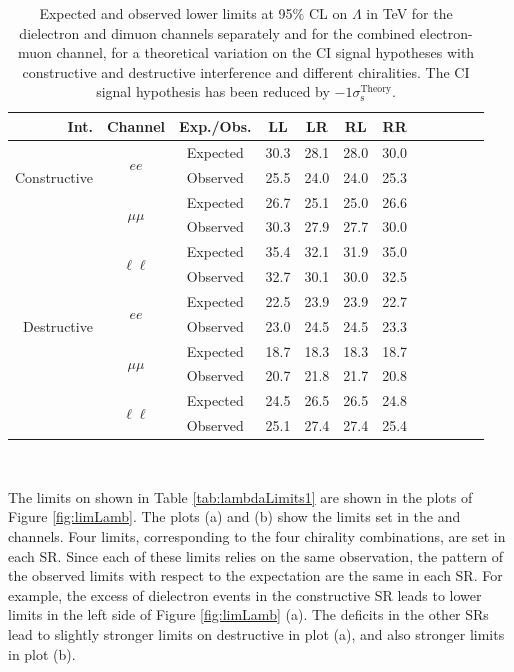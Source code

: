 \begin{table}[htp]
\begin{center}
\caption{Expected and observed lower limits at 95$\%$ CL on $\Lambda$ in TeV for the dielectron and dimuon channels separately
and for the combined electron-muon channel, for a theoretical variation on the CI signal hypotheses with
constructive and destructive interference and different chiralities.
The CI signal hypothesis has been reduced by $-1\sigma_\text{s}^\text{Theory}$.}
{\begin{tabular}{r c c c c c c c c c c c}\toprule
Int. & Channel & Exp./Obs. & LL & LR & RL & RR \\
\midrule
\multirow{3}{*}[-1.5em]{\begin{sideways}Constructive\end{sideways}} & \multirow{2}{*}{$ee$} & Expected & 30.3 & 28.1 & 28.0 & 30.0 \\
& & Observed & 25.5 & 24.0 & 24.0 & 25.3 \\
\cmidrule{2-7}
 & \multirow{2}{*}{$\mu\mu$} & Expected & 26.7 & 25.1 & 25.0 & 26.6 \\
& & Observed & 30.3 & 27.9 & 27.7 & 30.0 \\
\cmidrule{2-7}
 & \multirow{2}{*}{$\ell\ell$} & Expected & 35.4 & 32.1 & 31.9 & 35.0 \\
& & Observed & 32.7 & 30.1 & 30.0 & 32.5 \\
\midrule
\multirow{3}{*}[-1.5em]{\begin{sideways}Destructive\end{sideways}} & \multirow{2}{*}{$ee$} & Expected & 22.5 & 23.9 & 23.9 & 22.7 \\
& & Observed & 23.0 & 24.5 & 24.5 & 23.3 \\
\cmidrule{2-7}
 & \multirow{2}{*}{$\mu\mu$} & Expected & 18.7 & 18.3 & 18.3 & 18.7 \\
& & Observed & 20.7 & 21.8 & 21.7 & 20.8 \\
\cmidrule{2-7}
 & \multirow{2}{*}{$\ell\ell$} & Expected & 24.5 & 26.5 & 26.5 & 24.8 \\
& & Observed & 25.1 & 27.4 & 27.4 & 25.4 \\
\bottomrule\end{tabular}} \\
\label{tab:limits_on_lambda_theoryDn}
\end{center}
\end{table}

The limits on \lam shown in Table \ref{tab:lambdaLimits1} are shown in the plots of Figure \ref{fig:limLamb}.
The plots (a) and (b) show the limits set in the \ee and \mm channels.
Four limits, corresponding to the four chirality combinations, are set in each SR.
Since each of these limits relies on the same observation, the pattern of the observed limits with respect to the expectation are the same in each SR.
For example, the excess of dielectron events in the \ee constructive SR leads to lower limits in the left side of Figure \ref{fig:limLamb} (a).
The deficits in the other SRs lead to slightly stronger limits on destructive \lam in plot (a), and also stronger \mm limits in plot (b).

